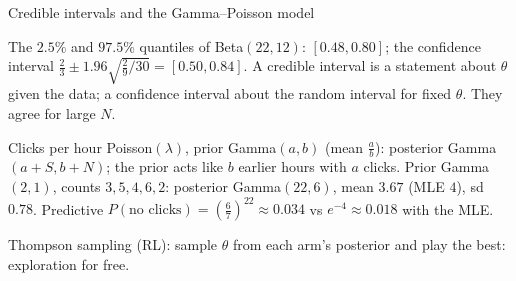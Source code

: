 \documentclass[aspectratio=1610,11pt]{beamer}
\begin{document}

\begin{frame}{Credible intervals and the Gamma--Poisson model}
    \begin{example}
        \small The $2.5\%$ and $97.5\%$ quantiles of Beta$(22, 12)$: $[0.48, 0.80]$; the confidence interval $\frac{2}{3} \pm 1.96\sqrt{\frac{2}{9}/30} = [0.50, 0.84]$. A credible interval is a statement about $\theta$ given the data; a confidence interval about the random interval for fixed $\theta$. They agree for large $N$.
    \end{example}
    \begin{example}
        \small Clicks per hour Poisson$(\lambda)$, prior Gamma$(a, b)$ (mean $\frac{a}{b}$): posterior Gamma$(a + S, b + N)$; the prior acts like $b$ earlier hours with $a$ clicks. Prior Gamma$(2, 1)$, counts $3, 5, 4, 6, 2$: posterior Gamma$(22, 6)$, mean $3.67$ (MLE $4$), sd $0.78$. Predictive $P(\text{no clicks}) = (\frac{6}{7})^{22} \approx 0.034$ vs $e^{-4} \approx 0.018$ with the MLE.
    \end{example}
    \small \textcolor{mlcolor}{Thompson sampling (RL): sample $\theta$ from each arm's posterior and play the best: exploration for free.}
\end{frame}
\end{document}
